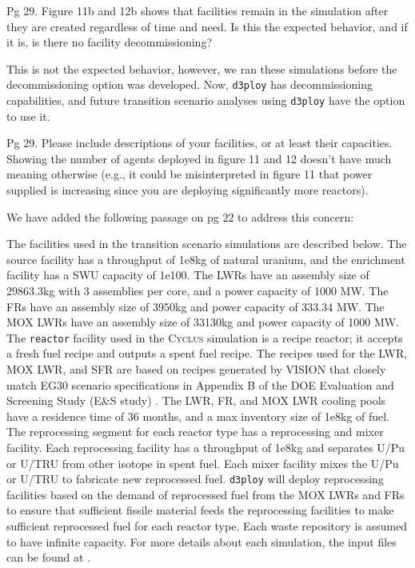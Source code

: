 \documentclass[answers,11pt]{exam}
\newcommand{\Cyclus}{\textsc{Cyclus}\xspace}%
\newcommand{\deploy}{\texttt{d3ploy}\xspace}%
\begin{document}
\begin{questions}
\question 
Pg 29. Figure 11b and 12b shows that facilities remain in the simulation after 
they are created regardless of time and need. Is this the expected behavior, 
and if it is, is there no facility decommissioning?

\begin{solution}
This is not the expected behavior, however, we ran these simulations before the 
decommissioning option was developed. Now, \deploy \cite{chee_arfc/d3ploy:_2019} 
has decommissioning capabilities, 
and future transition scenario analyses using \deploy have the option to use it.  
\end{solution}

\question
Pg 29. Please include descriptions of your facilities, or at least their capacities. 
Showing the number of agents deployed in figure 11 and 12 doesn't have much meaning 
otherwise (e.g., it could be misinterpreted in figure 11 that power supplied is 
increasing since you are deploying significantly more reactors).

\begin{solution}
We have added the following passage on pg 22 to address this concern: 

The facilities used in the transition scenario simulations are described below. 
The source facility has a throughput of 1e8kg of natural uranium, and the enrichment 
facility has a SWU capacity of 1e100. The LWRs have an 
assembly size of 29863.3kg with 3 assemblies per core, and a power capacity of 1000 MW. 
The FRs have an assembly size  of 3950kg and power capacity of 333.34 MW.
The MOX LWRs have an assembly size of 33130kg and power capacity of 1000 MW. 
The \texttt{reactor} facility used in the \Cyclus simulation 
is a recipe reactor; it accepts a fresh fuel recipe and outputs 
a spent fuel recipe. 
The recipes used for the LWR, MOX LWR, and 
SFR are based on recipes generated by VISION 
\cite{bae_arfctransition-scenarios_2019}
that closely match EG30 scenario specifications in 
Appendix B of the DOE Evaluation and Screening Study 
(E\&S study) \cite{wigeland_nuclear_2014}. 
The LWR, FR, and MOX LWR cooling pools have a residence time of 36 months, and a max 
inventory size of 1e8kg of fuel. 
The reprocessing segment for each reactor type has a reprocessing and mixer facility. 
Each reprocessing facility has a throughput of 1e8kg and separates U/Pu or U/TRU from 
other isotope in spent fuel. 
Each mixer facility mixes the U/Pu or U/TRU to fabricate new reprocessed fuel.  
\deploy will deploy reprocessing facilities based on the demand of reprocessed fuel 
from the MOX LWRs and FRs to ensure that sufficient fissile material 
feeds the reprocessing facilities to make sufficient reprocessed fuel 
for each reactor type. 
Each waste repository is assumed to have infinite capacity. 
For more details about each simulation, the input files can be found at 
\cite{bae_arfctransition-scenarios_2019}. 
\end{solution}

\end{questions}


  
\end{document}
